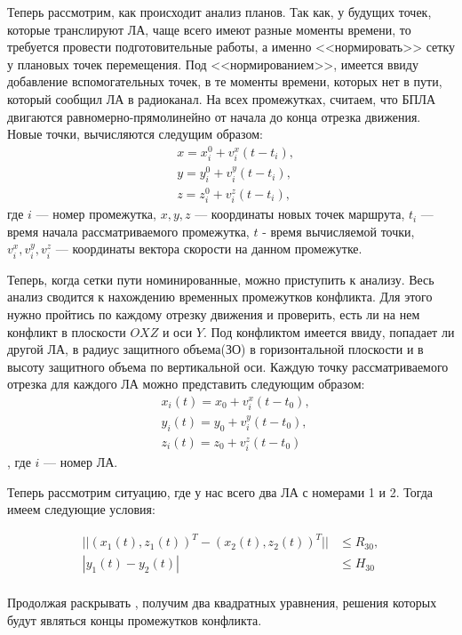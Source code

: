 \documentclass[a4paper,12pt]{article}
\numberwithin{figure}{subsubsection}
\begin{document}
Теперь рассмотрим, как происходит анализ планов. Так как, у будущих точек, которые транслируют ЛА, чаще всего имеют разные моменты времени, то требуется провести подготовительные работы, а именно <<нормировать>> сетку у плановых точек перемещения. Под <<нормированием>>, имеется ввиду добавление вспомогательных точек, в те моменты времени, которых нет в пути, который сообщил ЛА в радиоканал. На всех промежутках, считаем, что БПЛА двигаются равномерно-прямолинейно от начала до конца отрезка движения. Новые точки, вычисляются следущим образом:
\begin{align*}
    &x = x_i^0 + v_i^x(t - t_{i}),\\
    &y = y_i^0 + v_i^y(t - t_{i}),\\
    &z = z_i^0 + v_i^z(t - t_{i}),
\end{align*}
где $i$ --- номер промежутка, $x, y, z$ --- координаты новых точек маршрута, $t_i$ --- время начала рассматриваемого промежутка, $t$ - время вычисляемой точки, $v_i^x,v_i^y,v_i^z$ --- координаты вектора скорости на данном промежутке.

Теперь, когда сетки пути номинированные, можно приступить к анализу. Весь анализ сводится к нахождению временных промежутков конфликта. Для этого нужно пройтись по каждому отрезку движения и проверить, есть ли на нем конфликт в плоскости $OXZ$ и оси $Y$. Под конфликтом имеется ввиду, попадает ли другой ЛА, в радиус защитного объема(ЗО) в горизонтальной плоскости и в высоту защитного объема по вертикальной оси. Каждую точку рассматриваемого отрезка для каждого ЛА можно представить следующим образом:
\begin{align*}
    &x_i(t) = x_0 + v_i^x(t - t_0),\\
    &y_i(t) = y_0 + v_i^y(t - t_0),\\
    &z_i(t) = z_0 + v_i^z(t - t_0)
\end{align*}
, где $i$ --- номер ЛА.

Теперь рассмотрим ситуацию, где у нас всего два ЛА с номерами 1 и 2. Тогда имеем  следующие условия:

\begin{align*}
    ||(x_1(t), z_1(t))^T - (x_2(t), z_2(t))^T|| &\leq R_{30},\\
    |y_1(t) - y_2(t)| &\leq H_{30}\\
\end{align*}

Продолжая раскрывать , получим два квадратных уравнения, решения которых будут являться концы промежутков конфликта.
\end{document}
